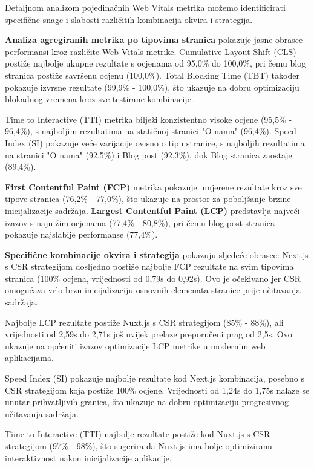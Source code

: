 Detaljnom analizom pojedinačnih Web Vitals metrika možemo identificirati specifične snage i slabosti različitih kombinacija okvira i strategija.

\textbf{Analiza agregiranih metrika po tipovima stranica} pokazuje jasne obrasce performansi kroz različite Web Vitals metrike. Cumulative Layout Shift (CLS) postiže najbolje ukupne rezultate s ocjenama od 95,0\% do 100,0\%, pri čemu blog stranica postiže savršenu ocjenu (100,0\%). Total Blocking Time (TBT) također pokazuje izvrsne rezultate (99,9\% - 100,0\%), što ukazuje na dobru optimizaciju blokadnog vremena kroz sve testirane kombinacije.

Time to Interactive (TTI) metrika bilježi konzistentno visoke ocjene (95,5\% - 96,4\%), s najboljim rezultatima na statičnoj stranici "O nama" (96,4\%). Speed Index (SI) pokazuje veće varijacije ovisno o tipu stranice, s najboljih rezultatima na stranici "O nama" (92,5\%) i Blog post (92,3\%), dok Blog stranica zaostaje (89,4\%).

\textbf{First Contentful Paint (FCP)} metrika pokazuje umjerene rezultate kroz sve tipove stranica (76,2\% - 77,0\%), što ukazuje na prostor za poboljšanje brzine inicijalizacije sadržaja. \textbf{Largest Contentful Paint (LCP)} predstavlja najveći izazov s najnižim ocjenama (77,4\% - 80,8\%), pri čemu blog post stranica pokazuje najslabije performanse (77,4\%).

\textbf{Specifične kombinacije okvira i strategija} pokazuju sljedeće obrasce: Next.js s CSR strategijom dosljedno postiže najbolje FCP rezultate na svim tipovima stranica (100\% ocjena, vrijednosti od 0,79s do 0,92s). Ovo je očekivano jer CSR omogućava vrlo brzu inicijalizaciju osnovnih elemenata stranice prije učitavanja sadržaja.

Najbolje LCP rezultate postiže Nuxt.js s CSR strategijom (85\% - 88\%), ali vrijednosti od 2,59s do 2,71s još uvijek prelaze preporučeni prag od 2,5s. Ovo ukazuje na općeniti izazov optimizacije LCP metrike u modernim web aplikacijama.

Speed Index (SI) pokazuje najbolje rezultate kod Next.js kombinacija, posebno s CSR strategijom koja postiže 100\% ocjene. Vrijednosti od 1,24s do 1,75s nalaze se unutar prihvatljivih granica, što ukazuje na dobru optimizaciju progresivnog učitavanja sadržaja.

Time to Interactive (TTI) najbolje rezultate postiže kod Nuxt.js s CSR strategijom (97\% - 98\%), što sugerira da Nuxt.js ima bolje optimiziranu interaktivnost nakon inicijalizacije aplikacije.

